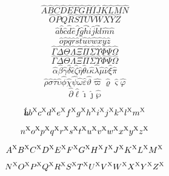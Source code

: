 
$$
\hat{A} \hat{B} \hat{C} \hat{D} \hat{E} \hat{F} \hat{G} \hat{H} 
\hat{I} \hat{J} \hat{K} \hat{L} \hat{M} \hat{N}
$$
%
$$
\hat{O} \hat{P} \hat{Q} \hat{R} \hat{S} \hat{T} \hat{U} \hat{V} 
\hat{W} \hat{X} \hat{Y} \hat{Z}
$$
%
$$
\hat{a} \hat{b} \hat{c} \hat{d} \hat{e} \hat{f} \hat{g} \hat{h} 
\hat{i} \hat{j} \hat{k} \hat{l} \hat{m} \hat{n}
$$
%
$$
\hat{o} \hat{p} \hat{q} \hat{r} \hat{s} \hat{t} \hat{u} \hat{v} 
\hat{w} \hat{x} \hat{y} \hat{z} 
$$
%
%
%
$$
\hat{\Gamma} \hat{\Delta} \hat{\Theta} \hat{\Lambda} \hat{\Xi} \hat{\Pi} 
\hat{\Sigma} \hat{\Upsilon} \hat{\Phi} \hat{\Psi} \hat{\Omega} 
$$
%
$$
\hat{\varGamma} \hat{\varDelta} \hat{\varTheta} \hat{\varLambda} \hat{\varXi} \hat{\varPi} 
\hat{\varSigma} \hat{\varUpsilon} \hat{\varPhi} \hat{\varPsi} \hat{\varOmega} 
$$
%
$$
\hat{\alpha} \hat{\beta} \hat{\gamma} \hat{\delta} \hat{\epsilon} \hat{\zeta} 
\hat{\eta} \hat{\theta} \hat{\iota} \hat{\kappa} \hat{\lambda} \hat{\mu} \hat{\nu} 
\hat{\xi} \hat{\pi}
$$
%
$$
\hat{\rho} \hat{\sigma} \hat{\tau} \hat{\upsilon} \hat{\phi} 
\hat{\chi} \hat{\psi} \hat{\omega} \hat{\varepsilon} \hat{\vartheta} \hat{\varpi} 
\hat{\varrho} \hat{\varsigma} \hat{\varphi} 
$$
%
$$
\hat{\partial} \hat{\ell} \hat{\imath} \hat{\jmath} \hat{\wp} 
$$



$$
\hat{a} 
b^{\rm X}
c^{\rm X}
d^{\rm X}
e^{\rm X}
f^{\rm X}
g^{\rm X}
h^{\rm X}
i^{\rm X}
j^{\rm X}
k^{\rm X}
l^{\rm X}
m^{\rm X}
$$

$$n^{\rm X}
o^{\rm X}
p^{\rm X}
q^{\rm X}
r^{\rm X}
s^{\rm X}
t^{\rm X}
u^{\rm X}
v^{\rm X}
w^{\rm X}
x^{\rm X}
y^{\rm X}
z^{\rm X}
$$

$$
A^{\rm X}
B^{\rm X}
C^{\rm X}
D^{\rm X}
E^{\rm X}
F^{\rm X}
G^{\rm X}
H^{\rm X}
I^{\rm X}
J^{\rm X}
K^{\rm X}
L^{\rm X}
M^{\rm X}
$$

$$
N^{\rm X}
O^{\rm X}
P^{\rm X}
Q^{\rm X}
R^{\rm X}
S^{\rm X}
T^{\rm X}
U^{\rm X}
V^{\rm X}
W^{\rm X}
X^{\rm X}
Y^{\rm X}
Z^{\rm X}
$$


